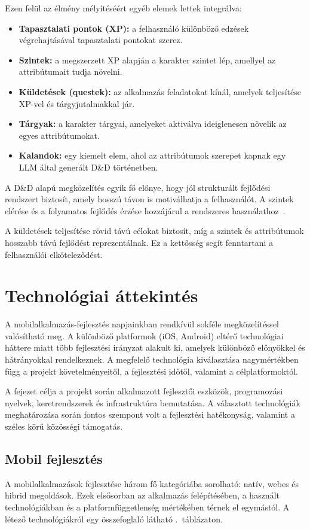 \documentclass[
]{thesis-ekf}
\theoremstyle{definition}
\theoremstyle{remark}
\begin{document}
Ezen felül az élmény mélyítéséért egyéb elemek lettek integrálva:

\begin{itemize}
    \item \textbf{Tapasztalati pontok (XP):} a felhasználó különböző edzések végrehajtásával tapasztalati pontokat szerez.
    \item \textbf{Szintek:} a megszerzett XP alapján a karakter szintet lép, amellyel az attribútumait tudja növelni.
    \item \textbf{Küldetések (questek):} az alkalmazás feladatokat kínál, amelyek teljesítése XP-vel és tárgyjutalmakkal jár.
    \item \textbf{Tárgyak:} a karakter tárgyai, amelyeket aktiválva ideiglenesen növelik az egyes attribútumokat.
    \item \textbf{Kalandok:} egy kiemelt elem, ahol az attribútumok szerepet kapnak egy LLM által generált D\&D történetben.
\end{itemize}


A D\&D alapú megközelítés egyik fő előnye, hogy jól strukturált fejlődési rendszert biztosít, amely hosszú távon is motiválhatja a felhasználót. A szintek elérése és a folyamatos fejlődés érzése hozzájárul a rendszeres használathoz~\cite{hamari2014does}.

A küldetések teljesítése rövid távú célokat biztosít, míg a szintek és attribútumok hosszabb távú fejlődést reprezentálnak. Ez a kettősség segít fenntartani a felhasználói elköteleződést.

\chapter{Technológiai áttekintés}
\label{chap_tech}

A mobilalkalmazás-fejlesztés napjainkban rendkívül sokféle megközelítéssel valósítható meg. A különböző platformok (iOS, Android) eltérő technológiai háttere miatt több fejlesztési irányzat alakult ki, amelyek különböző előnyökkel és hátrányokkal rendelkeznek. A megfelelő technológia kiválasztása nagymértékben függ a projekt követelményeitől, a fejlesztési időtől, valamint a célplatformoktól.  

A fejezet célja a projekt során alkalmazott fejlesztői eszközök, programozási nyelvek, keretrendszerek és infrastruktúra bemutatása. A választott technológiák meghatározása során fontos szempont volt a fejlesztési hatékonyság, valamint a széles körű közösségi támogatás. 

\section{Mobil fejlesztés}
A mobilalkalmazások fejlesztése három fő kategóriába sorolható: natív, webes és hibrid megoldások. Ezek elsősorban az alkalmazás felépítésében, a használt technológiákban és a platformfüggetlenség mértékében térnek el egymástól. A létező technológiákról egy összefoglaló látható .\ táblázaton.
\end{document}
